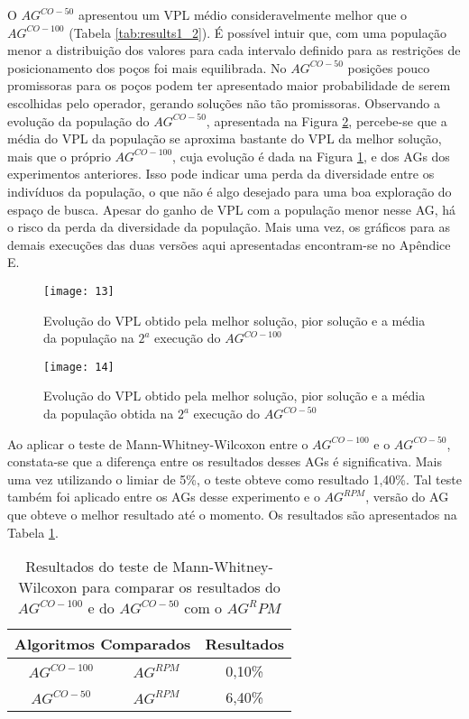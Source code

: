 O $AG^{CO-{50}}$ apresentou um VPL médio consideravelmente melhor que o $AG^{CO-{100}}$ (Tabela \ref{tab:results1_2}). É possível intuir que, com uma população menor a distribuição dos valores para cada intervalo definido para as restrições de posicionamento dos poços foi mais equilibrada. No $AG^{CO-{50}}$ posições pouco promissoras para os poços podem ter apresentado maior probabilidade de serem escolhidas pelo operador, gerando soluções não tão promissoras. Observando a evolução da população do $AG^{CO-{50}}$, apresentada na Figura \ref{fig:graph5_2}, percebe-se que a média do VPL da população se aproxima bastante do VPL da melhor solução, mais que o próprio $AG^{CO-{100}}$, cuja evolução é dada na Figura \ref{fig:graph5_1}, e dos AGs dos experimentos anteriores. Isso pode indicar uma perda da diversidade entre os indivíduos da população, o que não é algo desejado para uma boa exploração do espaço de busca. Apesar do ganho de VPL com a população menor nesse AG, há o risco da perda da diversidade da população. Mais uma vez, os gráficos para as demais execuções das duas versões aqui apresentadas encontram-se no Apêndice E.

\begin{figure}[H]
\centering
\texttt{[image: 13]}
\caption{Evolução do VPL obtido pela melhor solução, pior solução e a média da população na $2^a$ execução do $AG^{CO-{100}}$}
\label{fig:graph5_1}
\end{figure}

\begin{figure}[H]
\centering
\texttt{[image: 14]}
\caption{Evolução do VPL obtido pela melhor solução, pior solução e a média da população obtida na $2^a$ execução do $AG^{CO-{50}}$}
\label{fig:graph5_2}
\end{figure}

Ao aplicar o teste de Mann-Whitney-Wilcoxon entre o $AG^{CO-{100}}$ e o $AG^{CO-{50}}$, constata-se que a diferença entre os resultados desses AGs é significativa. Mais uma vez utilizando o limiar de 5\%, o teste obteve como resultado 1,40\%.  Tal teste também foi aplicado entre os AGs desse experimento e o $AG^{RPM}$, versão do AG que obteve o melhor resultado até o momento. Os resultados são apresentados na Tabela \ref{tab:mw5_1}.

\begin{table}[H]
\centering
\caption{Resultados do teste de Mann-Whitney-Wilcoxon para comparar os resultados do $AG^{CO-{100}}$ e do $AG^{CO-{50}}$ com o $AG^RPM$}
\label{tab:mw5_1}
\begin{tabular}{|c|c|c|}
\hline
\multicolumn{2}{|c|}{Algoritmos Comparados} & Resultados \\ \hline
$AG^{CO-{100}}$ & $AG^{RPM}$ & 0,10\% \\ \hline
$AG^{CO-{50}}$ & $AG^{RPM}$ & 6,40\% \\ \hline

\end{tabular}
\end{table}

